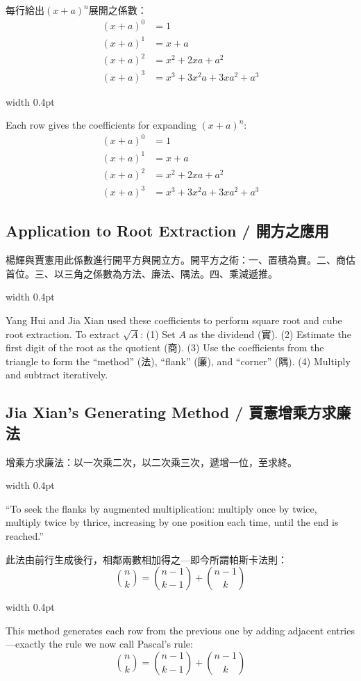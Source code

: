 \documentclass[10pt,a4paper]{article}
\newcommand{\zh}[1]{{\CJKfamily{notocjksc}#1}}
\newcommand{\bilingual}[2]{%
  \par\smallskip\noindent%
  \begin{minipage}[t]{0.47\textwidth}%
    \RaggedRight\small #1%
  \end{minipage}%
  \hfill\vrule width 0.4pt\hfill%
  \begin{minipage}[t]{0.47\textwidth}%
    \RaggedRight\small #2%
  \end{minipage}%
  \par\smallskip%
}
\begin{document}
\vspace{0.5em}
\bilingual{
  每行給出$(x+a)^n$展開之係數：
  \begin{align*}
  (x+a)^0 &= 1 \\
  (x+a)^1 &= x + a \\
  (x+a)^2 &= x^2 + 2xa + a^2 \\
  (x+a)^3 &= x^3 + 3x^2a + 3xa^2 + a^3
  \end{align*}
}{%
  Each row gives the coefficients for expanding $(x+a)^n$:
  \begin{align*}
  (x+a)^0 &= 1 \\
  (x+a)^1 &= x + a \\
  (x+a)^2 &= x^2 + 2xa + a^2 \\
  (x+a)^3 &= x^3 + 3x^2a + 3xa^2 + a^3
  \end{align*}
}

\subsection{Application to Root Extraction / 開方之應用}

\bilingual{
  楊輝與賈憲用此係數進行開平方與開立方。開平方之術：一、置積為實。二、商估首位。三、以三角之係數為方法、廉法、隅法。四、乘減遞推。
}{%
  Yang Hui and Jia Xian used these coefficients to perform square root and cube root extraction. To extract $\sqrt{A}$: (1) Set $A$ as the dividend (\zh{實}). (2) Estimate the first digit of the root as the quotient (\zh{商}). (3) Use the coefficients from the triangle to form the ``method'' (\zh{法}), ``flank'' (\zh{廉}), and ``corner'' (\zh{隅}). (4) Multiply and subtract iteratively.
}

\subsection{Jia Xian's Generating Method / 賈憲增乘方求廉法}

\bilingual{
  \zh{增乘方求廉法：以一次乘二次，以二次乘三次，遞增一位，至求終。}
}{%
  ``To seek the flanks by augmented multiplication: multiply once by twice, multiply twice by thrice, increasing by one position each time, until the end is reached.''
}

\bilingual{
  此法由前行生成後行，相鄰兩數相加得之---即今所謂帕斯卡法則：
  \[
  \binom{n}{k} = \binom{n-1}{k-1} + \binom{n-1}{k}
  \]
}{%
  This method generates each row from the previous one by adding adjacent entries---exactly the rule we now call Pascal's rule:
  \[
  \binom{n}{k} = \binom{n-1}{k-1} + \binom{n-1}{k}
  \]
}
\end{document}
